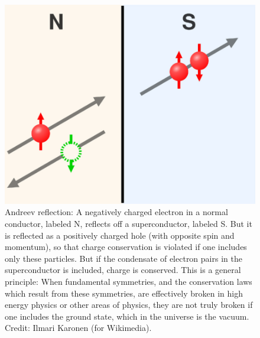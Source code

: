 \documentclass[12pt]{iopart}
\begin{document}
\begin{figure}[htbp]
\centering
\includegraphics[bb=0 0 360 270, width=5in]{Fig20-Andreev.eps}
\caption{Andreev reflection: A negatively charged electron in a normal conductor, labeled N, reflects off a superconductor, labeled S. But it is  reflected as a positively charged hole (with opposite spin and momentum), so that charge conservation is violated if one includes only these particles. But if the condensate of electron pairs in the superconductor is included, charge is conserved. This is a general principle: When fundamental symmetries, and the conservation laws which result from these symmetries, are effectively broken in high energy physics or other areas of physics, they are not truly broken if one includes the ground state, which in the universe is the vacuum. Credit: Ilmari Karonen (for Wikimedia).
\label{Fig20-Andreev.eps}}
\end{figure}
\end{document}
